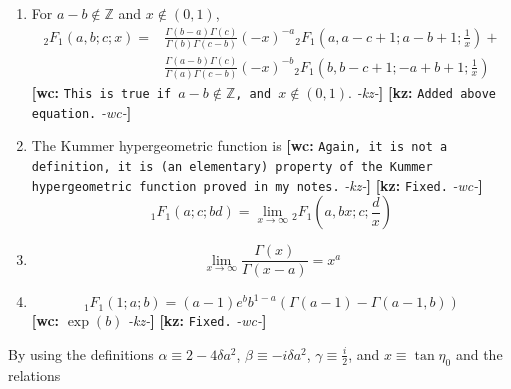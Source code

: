 \documentclass[preprint,notitlepage,amsmath,amssymb,floatfix]{revtex4-1}
\newcommand{\XXX}[3]{{\bf [#1: } {\tt #3} {\it -#2-}{\bf ]}}
\begin{document}
\begin{enumerate}
  \item For $a - b\notin \mathbb{Z}$ and $x\notin\left(0, 1\right)$,
  \begin{equation}
    \label{eq:2F1transform}
    \begin{split}
    {}_2F_1\left(a,b;c;x\right) =& \frac{\Gamma\left(b-a\right)\Gamma\left(c\right)}{\Gamma\left(b\right)\Gamma\left(c-b\right)}\left(-x\right)^{-a} {}_2F_1\left(a,a-c+1;a-b+1;\frac{1}{x}\right) + \\
    & \frac{\Gamma\left(a-b\right)\Gamma\left(c\right)}{\Gamma\left(a\right)\Gamma\left(c-b\right)}\left(-x\right)^{-b} {}_2F_1\left(b,b-c+1;-a+b+1;\frac{1}{x}\right)
    \end{split}
  \end{equation}
  \XXX{wc}{kz}{This is true if $a-b\notin \mathbb{Z}$, and $x\notin(0,1).$} \XXX{kz}{wc}{Added above equation.}

  \item The Kummer hypergeometric function is \XXX{wc}{kz}{Again, it is not a definition, it is (an elementary) property of the Kummer hypergeometric function proved in my notes.} \XXX{kz}{wc}{Fixed.}
  \begin{equation}
  {}_1F_1\left(a;c;bd\right) = \lim_{x\to\infty} {}_2F_1\left(a,bx;c;\frac{d}{x}\right)
  \end{equation}

  \item
  \begin{equation}
  \lim_{x\to\infty}\frac{\Gamma\left(x\right)}{\Gamma\left(x-a\right)} = x^a
  \end{equation}

  \item
  \begin{equation}
  \label{eq:1F1_limit}
  {}_1F_1\left(1;a;b\right) = \left(a-1\right)e^{b}b^{1-a}\left(\Gamma\left(a-1\right)-\Gamma\left(a-1,b\right)\right)
  \end{equation}
  \XXX{wc}{kz}{$\exp(b)$} \XXX{kz}{wc}{Fixed.}
\end{enumerate}

\noindent By using the definitions $\alpha\equiv 2-4\delta a^2$, $\beta\equiv -i\delta a^2$, $\gamma\equiv\frac{i}{2}$, and $x\equiv\tan\eta_0$ and the relations
\end{document}
